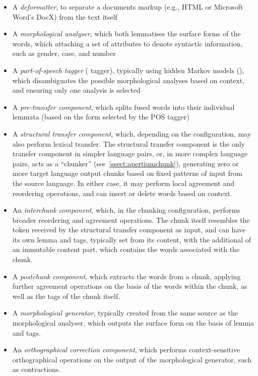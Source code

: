\begin{itemize}
\item A \textit{deformatter}, to separate a documents markup (e.g., HTML or Microsoft Word's DocX) from 
the text itself
\item A \textit{morphological analyser}, which both lemmatises the surface forms of the words, which attaching 
a set of attributes to denote syntactic information, such as gender, case, and number
\item A \textit{part-of-speech tagger} ( tagger), typically using hidden Markov models (), 
which disambiguates the possible morphological analyses based on context, and ensuring only one analysis is selected
\item A \textit{pre-transfer component}, which splits fused words into their individual lemmata (based on the 
form selected by the POS tagger)
\item A \textit{structural transfer component}, which, depending on the configuration, may also perform lexical 
transfer. The structural transfer component is the only transfer component in simpler language pairs, or, in more 
complex language pairs, acts as a ``chunker'' (see~\ref{ssect:apertiumchunk}), generating zero or more target 
language output chunks based on fixed patterns of input from the source language. In either case, it may perform 
local agreement and reordering operations, and can insert or delete words based on context.
\item An \textit{interchunk component}, which, in the chunking configuration, performs broader reordering and 
agreement operations. The chunk itself resembles the token received by the structural transfer component as input, 
and can have its own lemma and tags, typically set from its content, with the additional of an immutable content 
part, which contains the words associated with the chunk.
\item A \textit{postchunk component}, which extracts the words from a chunk, applying further agreement operations 
on the basis of the words within the chunk, as well as the tags of the chunk itself.
\item A \textit{morphological generator}, typically created from the same source as the morphological analyser, which 
outputs the surface form on the basis of lemma and tags.
\item An \textit{orthographical correction component}, which performs context-sensitive orthographical operations on 
the output of the morphological generator, such as contractions. 
\end{itemize}

